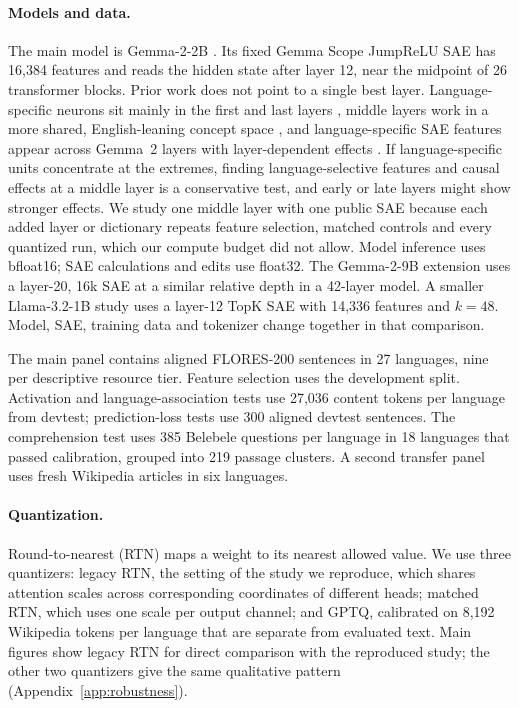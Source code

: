 \documentclass[11pt]{article}
\begin{document}
\paragraph{Models and data.}
The main model is Gemma-2-2B \citep{gemma2024}. Its fixed Gemma Scope JumpReLU SAE has 16,384 features and reads the hidden state after layer 12, near the midpoint of 26 transformer blocks. Prior work does not point to a single best layer. Language-specific neurons sit mainly in the first and last layers \citep{tang-etal-2024-language,kojima-etal-2024-multilingual}, middle layers work in a more shared, English-leaning concept space \citep{wendler-etal-2024-llamas}, and language-specific SAE features appear across Gemma~2 layers with layer-dependent effects \citep{deng-etal-2025-unveiling}. If language-specific units concentrate at the extremes, finding language-selective features and causal effects at a middle layer is a conservative test, and early or late layers might show stronger effects. We study one middle layer with one public SAE because each added layer or dictionary repeats feature selection, matched controls and every quantized run, which our compute budget did not allow. Model inference uses bfloat16; SAE calculations and edits use float32. The Gemma-2-9B extension uses a layer-20, 16k SAE at a similar relative depth in a 42-layer model. A smaller Llama-3.2-1B study \citep{grattafiori2024} uses a layer-12 TopK SAE with 14,336 features and $k=48$. Model, SAE, training data and tokenizer change together in that comparison.

The main panel contains aligned FLORES-200 sentences \citep{nllb2022} in 27 languages, nine per descriptive resource tier. Feature selection uses the development split. Activation and language-association tests use 27,036 content tokens per language from devtest; prediction-loss tests use 300 aligned devtest sentences. The comprehension test uses 385 Belebele questions per language in 18 languages that passed calibration, grouped into 219 passage clusters. A second transfer panel uses fresh Wikipedia articles in six languages.

\paragraph{Quantization.}
Round-to-nearest (RTN) maps a weight to its nearest allowed value. We use three quantizers: legacy RTN, the setting of the study we reproduce, which shares attention scales across corresponding coordinates of different heads; matched RTN, which uses one scale per output channel; and GPTQ, calibrated on 8,192 Wikipedia tokens per language that are separate from evaluated text. Main figures show legacy RTN for direct comparison with the reproduced study; the other two quantizers give the same qualitative pattern (Appendix~\ref{app:robustness}).
\end{document}
